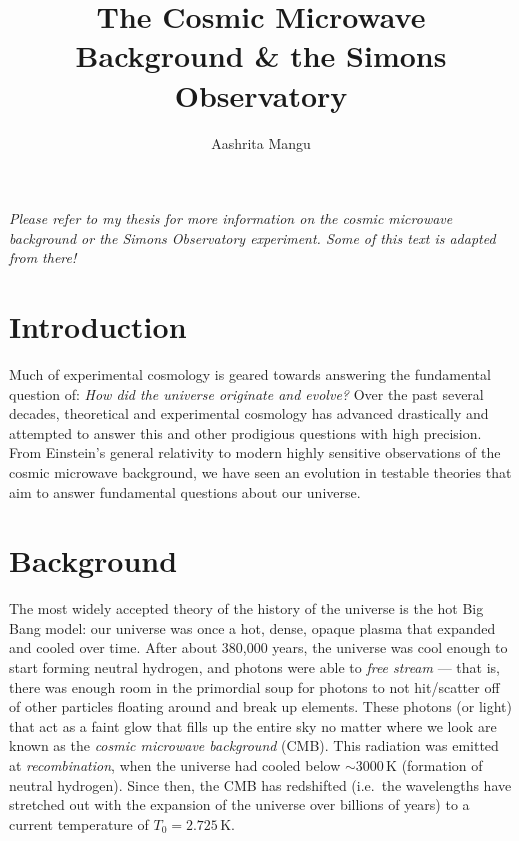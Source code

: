 \documentclass[12pt]{article}
\title{The Cosmic Microwave Background \& the Simons Observatory}
\author{Aashrita Mangu}
\date{}
\begin{document}
\maketitle

\textit{Please refer to my thesis for more information on the cosmic microwave background or the Simons Observatory experiment. Some of this text is adapted from there!}

\tableofcontents
\newpage

\section{Introduction}

Much of experimental cosmology is geared towards answering the fundamental question of: \textit{How did the universe originate and evolve?} Over the past several decades, theoretical and experimental cosmology has advanced drastically and attempted to answer this and other prodigious questions with high precision. From Einstein's general relativity to modern highly sensitive observations of the cosmic microwave background, we have seen an evolution in testable theories that aim to answer fundamental questions about our universe.

\section{Background}
\label{sec:background}

The most widely accepted theory of the history of the universe is the hot Big Bang model: our universe was once a hot, dense, opaque plasma that expanded and cooled over time. After about 380,000 years, the universe was cool enough to start forming neutral hydrogen, and photons were able to \textit{free stream} --- that is, there was enough room in the primordial soup for photons to not hit/scatter off of other particles floating around and break up elements. These photons (or light) that act as a faint glow that fills up the entire sky no matter where we look are known as the \textit{cosmic microwave background} (CMB). This radiation was emitted at \textit{recombination}, when the universe had cooled below $\sim$3000\,K (formation of neutral hydrogen). Since then, the CMB has redshifted (i.e.\ the wavelengths have stretched out with the expansion of the universe over billions of years) to a current temperature of $T_0 = 2.725$\,K.
\end{document}
